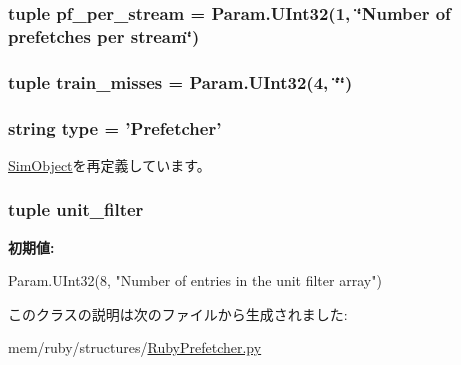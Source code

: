 \hypertarget{classRubyPrefetcher_1_1Prefetcher_a29fdb5ede5ece37a3ab1ab48eaa53844}{
\subsubsection[{pf\_\-per\_\-stream}]{\setlength{\rightskip}{0pt plus 5cm}tuple {\bf pf\_\-per\_\-stream} = Param.UInt32(1, \char`\"{}Number of prefetches per stream\char`\"{})}}
\label{classRubyPrefetcher_1_1Prefetcher_a29fdb5ede5ece37a3ab1ab48eaa53844}
\hypertarget{classRubyPrefetcher_1_1Prefetcher_ac72f54c0da25cca5d7b9c1e9c7310f9d}{
\subsubsection[{train\_\-misses}]{\setlength{\rightskip}{0pt plus 5cm}tuple {\bf train\_\-misses} = Param.UInt32(4, \char`\"{}\char`\"{})}}
\label{classRubyPrefetcher_1_1Prefetcher_ac72f54c0da25cca5d7b9c1e9c7310f9d}
\hypertarget{classRubyPrefetcher_1_1Prefetcher_acce15679d830831b0bbe8ebc2a60b2ca}{
\subsubsection[{type}]{\setlength{\rightskip}{0pt plus 5cm}string {\bf type} = '{\bf Prefetcher}'}}
\label{classRubyPrefetcher_1_1Prefetcher_acce15679d830831b0bbe8ebc2a60b2ca}


\hyperlink{classm5_1_1SimObject_1_1SimObject_acce15679d830831b0bbe8ebc2a60b2ca}{SimObject}を再定義しています。\hypertarget{classRubyPrefetcher_1_1Prefetcher_a79ff24e979a6e9ad98a225a5e3f26e76}{
\subsubsection[{unit\_\-filter}]{\setlength{\rightskip}{0pt plus 5cm}tuple {\bf unit\_\-filter}}}
\label{classRubyPrefetcher_1_1Prefetcher_a79ff24e979a6e9ad98a225a5e3f26e76}
{\bfseries 初期値:}
\begin{DoxyCode}
Param.UInt32(8,
        "Number of entries in the unit filter array")
\end{DoxyCode}


このクラスの説明は次のファイルから生成されました:\begin{DoxyCompactItemize}
\item 
mem/ruby/structures/\hyperlink{RubyPrefetcher_8py}{RubyPrefetcher.py}\end{DoxyCompactItemize}
